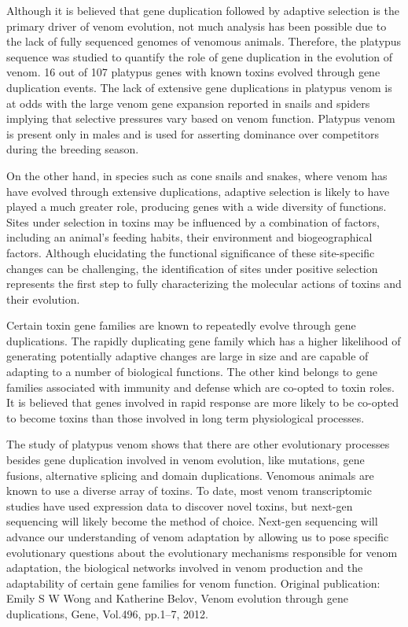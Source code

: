 \documentclass{resoResearch}
\begin{document}
\begin{multicols}{2}
Although it is believed that gene duplication
followed by adaptive selection is the primary
driver of venom evolution, not much analysis
has  been  possible  due  to  the  lack  of  fully
sequenced  genomes  of  venomous  animals.
Therefore, the platypus sequence was studied
to quantify the role of gene duplication in the
evolution of venom.  16  out of 107 platypus
genes  with  known  toxins  evolved  through
gene duplication events.   The lack of extensive gene duplications in platypus venom is at
odds  with  the  large  venom  gene  expansion
reported  in  snails  and  spiders  implying  that
selective pressures vary based on venom function. Platypus venom is present only in males
and is used for asserting dominance over competitors during the breeding season.

On  the  other  hand,
in  species  such  as  cone
snails  and  snakes,  where  venom  has  have
evolved through extensive duplications, adaptive selection is likely to have played a much
greater  role,  producing  genes  with  a  wide
diversity of functions. Sites under selection in
toxins may be influenced by a combination of
factors, including an animal’s feeding habits,
their  environment  and  biogeographical  factors. Although elucidating the functional significance of these site-specific changes can be
challenging,  the identification  of  sites  under
positive selection represents the first  step to
fully characterizing the molecular  actions of
toxins and their evolution.

Certain toxin gene families are known to repeatedly  evolve  through  gene  duplications.
The  rapidly  duplicating  gene  family  which
has  a  higher  likelihood of  generating potentially adaptive changes are large in size and
are capable of adapting to a number  of biological functions.  The other  kind  belongs  to
gene  families  associated  with  immunity  and
defense which are co-opted to toxin roles. It is
believed that genes involved in rapid response
are  more  likely  to  be  co-opted  to  become
toxins than those involved in long term physiological  processes.

The study of platypus venom
shows that there
are other evolutionary processes besides gene
duplication involved in venom evolution, like
mutations,  gene fusions,  alternative  splicing
and domain duplications. Venomous animals
are known to use a diverse array of toxins. To
date, most venom transcriptomic studies have
used expression data to discover novel toxins,
but  next-gen  sequencing  will  likely  become
the  method  of  choice.  Next-gen  sequencing
will advance our understanding of venom adaptation by allowing us to pose specific evolutionary  questions  about  the  evolutionary
mechanisms  responsible  for  venom  adaptation,  the  biological  networks  involved  in
venom production and the adaptability of certain gene families for venom function.
Original publication: Emily S  W Wong  and
Katherine  Belov,  Venom  evolution  through
gene  duplications,
Gene,  Vol.496,  pp.1–7,
2012.


\end{multicols}
\end{document}
